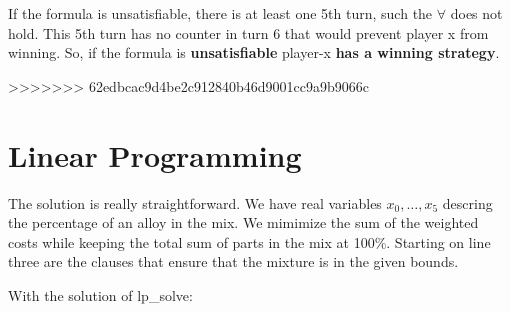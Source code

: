 \documentclass{base}
\begin{document}
If the formula is unsatisfiable, there is at least one 5th turn, such the $\forall$ does not hold. This 5th turn has no counter in turn 6 that would prevent player x from winning.
So, if the formula is \textbf{unsatisfiable} player-x \textbf{has a winning strategy}.

\clearpage
>>>>>>> 62edbcac9d4be2c912840b46d9001cc9a9b9066c
\section*{Linear Programming}

The solution is really straightforward.
We have real variables $x_0,\dots,x_5$ descring the percentage of an alloy in the mix.
We mimimize the sum of the weighted costs while keeping the total sum of parts in the mix at 100\%.
Starting on line three are the clauses that ensure that the mixture is in the given bounds.

With the solution of lp\_solve:

\end{document}
